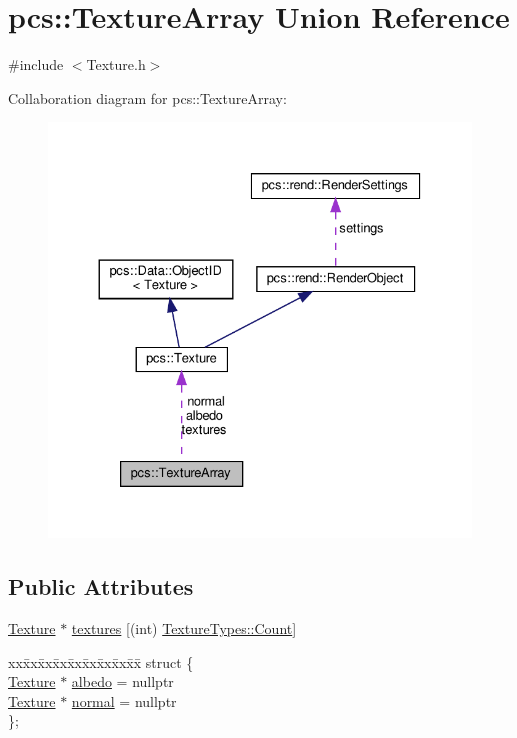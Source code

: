 \hypertarget{unionpcs_1_1TextureArray}{}\section{pcs\+:\+:Texture\+Array Union Reference}
\label{unionpcs_1_1TextureArray}


{\ttfamily \#include $<$Texture.\+h$>$}



Collaboration diagram for pcs\+:\+:Texture\+Array\+:\nopagebreak
\begin{figure}[H]
\begin{center}
\leavevmode
\includegraphics[width=330pt]{unionpcs_1_1TextureArray__coll__graph}
\end{center}
\end{figure}
\subsection*{Public Attributes}
\begin{DoxyCompactItemize}
\item 
\hyperlink{classpcs_1_1Texture}{Texture} $\ast$ \hyperlink{unionpcs_1_1TextureArray_a04e4947ed39b82bc46eb4c5be4a5c361}{textures} \mbox{[}(int) \hyperlink{namespacepcs_aff33aa4c1c94147ad9ade12bc60958d4ae93f994f01c537c4e2f7d8528c3eb5e9}{Texture\+Types\+::\+Count}\mbox{]}
\item 
\begin{tabbing}
xx\=xx\=xx\=xx\=xx\=xx\=xx\=xx\=xx\=\kill
struct \{\\
\>\hyperlink{classpcs_1_1Texture}{Texture} $\ast$ \hyperlink{unionpcs_1_1TextureArray_ad2b4ebb3221d461406db106b1f186d1f}{albedo} = nullptr\\
\>\hyperlink{classpcs_1_1Texture}{Texture} $\ast$ \hyperlink{unionpcs_1_1TextureArray_a70257f556ecd88b438daa286d5b2d3ce}{normal} = nullptr\\
\}; \\

\end{tabbing}\end{DoxyCompactItemize}


